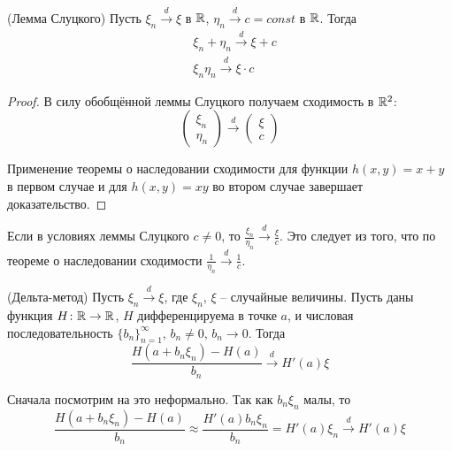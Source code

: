 \begin{corollary} (Лемма Слуцкого)
    Пусть $\xi_n \xrightarrow{d} \xi$ в $\mathbb{R}$, $\eta_n \xrightarrow{d} c = const$ в $\mathbb{R}$. Тогда
    \begin{align*}
        & \xi_n + \eta_n \xrightarrow{d} \xi + c
        \\
        & \xi_n \eta_n \xrightarrow{d} \xi \cdot c
    \end{align*}
\end{corollary}

\begin{proof}
    В силу обобщённой леммы Слуцкого получаем сходимость в $\mathbb{R}^2$:
    \[
        \begin{pmatrix}
            \xi_n \\ \eta_n
        \end{pmatrix} \xrightarrow{d}
        \begin{pmatrix}
            \xi \\ c
        \end{pmatrix}
    \]

    Применение теоремы о наследовании сходимости для функции $h(x, y) = x + y$ в первом случае и для $h(x, y) = xy$ во втором случае завершает доказательство.
\end{proof}

\begin{note}
    Если в условиях леммы Слуцкого $c \neq 0$, то $\frac{\xi_n}{\eta_n} \xrightarrow{d} \frac{\xi}{c}$. Это следует из того, что по теореме о наследовании сходимости $\frac{1}{\eta_n} \xrightarrow{d} \frac{1}{c}$.
\end{note}

\begin{proposition} (Дельта-метод)
    Пусть $\xi_n \xrightarrow{d} \xi$, где $\xi_n$, $\xi$ -- случайные величины. Пусть даны функция $H \colon \mathbb{R} \to \mathbb{R}$, $H$ дифференцируема в точке $a$, и числовая последовательность $\{b_n\}_{n=1}^\infty$, $b_n \neq 0$, $b_n \to 0$. Тогда
    \[
        \frac{H(a+b_n\xi_n) - H(a)}{b_n} \xrightarrow{d} H'(a) \xi
    \]
\end{proposition}

\begin{note}
    Сначала посмотрим на это неформально. Так как $b_n \xi_n$ малы, то
    \[
        \frac{H(a+b_n\xi_n) - H(a)}{b_n} \approx \frac{H'(a) b_n\xi_n}{b_n} = H'(a) \xi_n \xrightarrow{d} H'(a) \xi 
    \]
\end{note}

